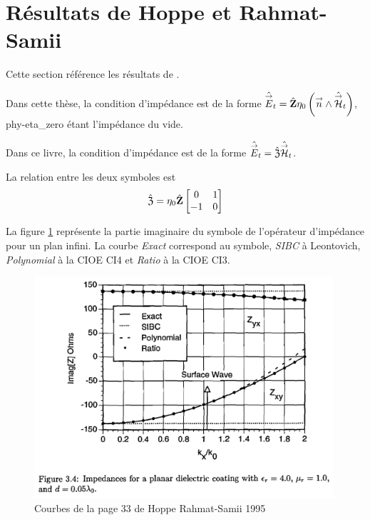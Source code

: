 \section{Résultats de Hoppe et Rahmat-Samii}

Cette section référence les résultats de \cite{hoppe_impedance_1995}. 

Dans cette thèse, la condition d'impédance est de la forme \(\hat{{\overset{\rightarrow}{E}}}_t = \hat{\mathbf{Z}} \eta_0\left({\overset{\rightarrow}{n}} \wedge \hat{{\overset{\rightarrow}{\mathcal{H}}}}_t\right)\), \gls{phy-eta_zero} étant l'impédance du vide.

Dans ce livre, la condition d'impédance est de la forme \(\hat{{\overset{\rightarrow}{E}}}_t = \hat{\mathfrak{Z}} \hat{{\overset{\rightarrow}{\mathcal{H}}}}_t\).

La relation entre les deux symboles est
\begin{equation}
  \hat{\mathfrak{Z}} = \eta_0\hat{\mathbf{Z}}\begin{bmatrix}0&1\\-1&0\end{bmatrix}
\end{equation}

La figure \ref{fig:annex:hoppe:p33} représente la partie imaginaire du symbole de l'opérateur d'impédance pour un plan infini. La courbe \textit{Exact} correspond au symbole, \textit{SIBC} à Leontovich, \textit{Polynomial} à la CIOE CI4 et \textit{Ratio} à la CIOE CI3.

\begin{figure}[h!tb]
    \includegraphics[width=0.99\textwidth]{images/hoppe/p33_imp_cylindre.png}
    \caption{Courbes de la page 33 de Hoppe Rahmat-Samii 1995}
    \label{fig:annex:hoppe:p33}
\end{figure}

